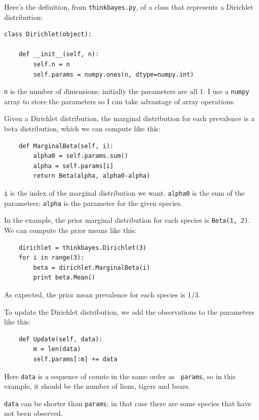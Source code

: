 \documentclass[12pt]{book}
\begin{document}
Here's the definition, from {\tt thinkbayes.py}, of a class that
represents a Dirichlet distribution:

\begin{verbatim}
class Dirichlet(object):

    def __init__(self, n):
        self.n = n
        self.params = numpy.ones(n, dtype=numpy.int)
\end{verbatim}

{\tt n} is the number of dimensions; initially the parameters
are all 1.  I use a {\tt numpy} array to store the parameters
so I can take advantage of array operations.

Given a Dirichlet distribution, the marginal distribution
for each prevalence is a beta distribution, which we can
compute like this:

\begin{verbatim}
    def MarginalBeta(self, i):
        alpha0 = self.params.sum()
        alpha = self.params[i]
        return Beta(alpha, alpha0-alpha)
\end{verbatim}

{\tt i} is the index of the marginal distribution we want.
{\tt alpha0} is the sum of the parameters; {\tt alpha} is the
parameter for the given species.

In the example, the prior marginal distribution for each species
is {\tt Beta(1, 2)}.  We can compute the prior means like
this:

\begin{verbatim}
    dirichlet = thinkbayes.Dirichlet(3)
    for i in range(3):
        beta = dirichlet.MarginalBeta(i)
        print beta.Mean()
\end{verbatim}

As expected, the prior mean prevalence for each species is 1/3.

To update the Dirichlet distribution, we add the
observations to the parameters like this:

\begin{verbatim}
    def Update(self, data):
        m = len(data)
        self.params[:m] += data
\end{verbatim}

Here {\tt data} is a sequence of counts in the same order as {\tt
  params}, so in this example, it should be the number of lions,
tigers and bears.

{\tt data} can be shorter than {\tt params}; in that
case there are some species that have not been
observed.
\end{document}
